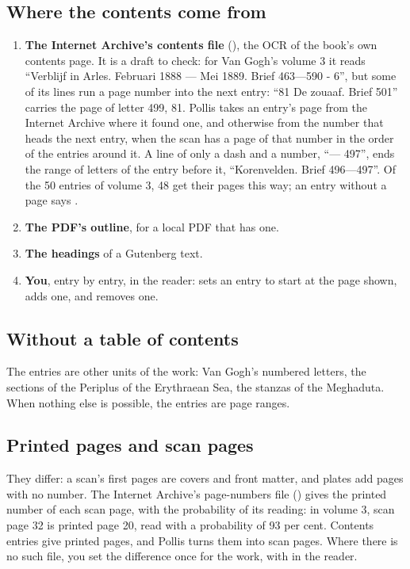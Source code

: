 \subsection{Where the contents come from}
\begin{enumerate}
  \item \textbf{The Internet Archive's contents file} (), the OCR of the book's own contents page. It
    is a draft to check: for Van Gogh's volume 3 it reads ``Verblijf in Arles. Februari 1888 --- Mei 1889. Brief
    463---590 - 6'', but some of its lines run a page number into the next entry: ``81 De zouaaf. Brief 501'' carries
    the page of letter 499, 81. Pollis takes an entry's page from the Internet Archive where it found one, and otherwise
    from the number that heads the next entry, when the scan has a page of that number in the order of the entries
    around it. A line of only a dash and a number, ``--- 497'', ends the range of letters of the entry before it,
    ``Korenvelden. Brief 496---497''. Of the 50 entries of volume 3, 48 get their pages this way; an entry without
    a page says .
  \item \textbf{The PDF's outline}, for a local PDF that has one.
  \item \textbf{The headings} of a Gutenberg text.
  \item \textbf{You}, entry by entry, in the reader:  sets an entry to start at the page shown,
     adds one, and  removes one.
\end{enumerate}

\subsection{Without a table of contents}
The entries are other units of the work: Van Gogh's numbered letters, the sections of the Periplus of the Erythraean
Sea, the stanzas of the Meghaduta. When nothing else is possible, the entries are page ranges.

\subsection{Printed pages and scan pages}
They differ: a scan's first pages are covers and front matter, and plates add pages with no number. The Internet
Archive's page-numbers file () gives the printed number of each scan page, with the
probability of its reading: in volume 3, scan page 32 is printed page 20, read with a probability of 93 per cent.
Contents entries give printed pages, and Pollis turns them into scan pages. Where there is no such file, you set the
difference once for the work, with  in the reader.

